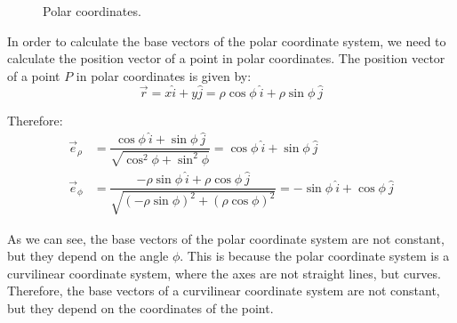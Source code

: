 \begin{figure}
    \caption{Polar coordinates.}
    \label{fig:polar_coordinates}
\end{figure}


In order to calculate the base vectors of the polar coordinate system, we need to calculate the position vector of a point in polar coordinates. The position vector of a point $P$ in polar coordinates is given by:
\begin{equation*}
    \vec{r} = x \hat{i} + y \hat{j}
    = \rho \cos \phi\  \hat{i} + \rho \sin \phi\  \hat{j}
\end{equation*}

Therefore:
\begin{align*}
    \vec{e}_\rho &= \dfrac{\cos \phi\  \hat{i} + \sin \phi\  \hat{j}}{\sqrt{\cos^2 \phi + \sin^2 \phi}} = \cos \phi\  \hat{i} + \sin \phi\  \hat{j} \\
    \vec{e}_\phi &= \dfrac{-\rho \sin \phi\  \hat{i} + \rho \cos \phi\  \hat{j}}{\sqrt{(-\rho \sin \phi)^2 + (\rho \cos \phi)^2}} = -\sin \phi\  \hat{i} + \cos \phi\  \hat{j}
\end{align*}

As we can see, the base vectors of the polar coordinate system are not constant, but they depend on the angle $\phi$. This is because the polar coordinate system is a curvilinear coordinate system, where the axes are not straight lines, but curves. Therefore, the base vectors of a curvilinear coordinate system are not constant, but they depend on the coordinates of the point.

